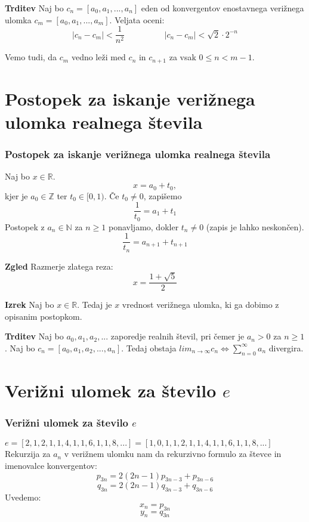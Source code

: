 \documentclass{beamer}
\newcommand{\N}{\mathbb{N}}
\newcommand{\R}{\mathbb{R}}
\newcommand{\Z}{\mathbb{Z}}
\newenvironment{iz}{\begin{block}{\textbf{Izrek}}}{\end{block}}
\newenvironment{zg}{\begin{block}{\textbf{Zgled}}}{\end{block}}
\newenvironment{trd}{\begin{block}{\textbf{Trditev}}}{\end{block}}
\begin{document}
\begin{frame}
	\begin{trd}
	Naj bo $c_n = [a_0, a_1, ..., a_n]$ eden od konvergentov enostavnega verižnega ulomka $c_m = [a_0, a_1, ..., a_m]$. Veljata oceni: \[ |c_n-c_m|<\frac{1}{n^2} \hspace{2cm}|c_n-c_m|<\sqrt{2}\cdot 2^{-n} \]
	\end{trd}
	\vspace{5mm}
	Vemo tudi, da $c_m$ vedno leži med $c_n$ in $c_{n+1}$ za vsak $0\leq n < m-1$.
\end{frame}

\section{Postopek za iskanje verižnega ulomka realnega števila}

\begin{frame}
\frametitle{Postopek za iskanje verižnega ulomka realnega števila}
Naj bo $x \in \R$. \pause
\[ x = a_0+t_0, \]
kjer je $a_0 \in \Z$ ter $t_0 \in [0,1)$. \pause
Če $t_0 \neq 0$, zapišemo \[ \frac{1}{t_0} = a_1 + t_1 \] \pause
Postopek z $a_n \in \N$ za $n \geq 1$ ponavljamo, dokler $t_n \neq 0$ (zapis je lahko neskončen).
\[ \frac{1}{t_n} = a_{n+1}+t_{n+1} \]  \pause
	\begin{zg}
	Razmerje zlatega reza: \[x = \frac{1+\sqrt{5}}{2} \]
	\end{zg}
\end{frame}

\begin{frame}
	\begin{iz}
	Naj bo $x \in \R$. Tedaj je $x$ vrednost verižnega ulomka, ki ga dobimo z opisanim postopkom.
	\end{iz} \pause
	\begin{trd}
	Naj bo $a_0, a_1, a_2, ...$ zaporedje realnih števil, pri čemer je $a_n > 0$ za $n\geq1$. Naj bo $c_n = [a_0, a_1, a_2, ..., a_n]$. Tedaj obstaja $lim_{n\to\infty}c_n \Leftrightarrow \sum_{n=0}^{\infty}a_n$ divergira.
	\end{trd}
\end{frame}

\section{Verižni ulomek za število $e$}

\begin{frame}
\frametitle{Verižni ulomek za število $e$}
	$e = [2, 1, 2, 1, 1, 4, 1, 1, 6, 1, 1, 8, ...] = [1, 0, 1, 1, 2, 1, 1, 4, 1, 1, 6, 1, 1, 8, ...]$
	Rekurzija za $a_n$ v verižnem ulomku nam da rekurzivno formulo za števce in imenovalce konvergentov:
	\[ p_{3n} = 2(2n-1)p_{3n-3}+p_{3n-6} \]
	\[ q_{3n} = 2(2n-1)q_{3n-3}+q_{3n-6} \]
	Uvedemo: $$x_n = p_{3n}$$ $$y_n=q_{3n}$$
\end{frame}
\end{document}
